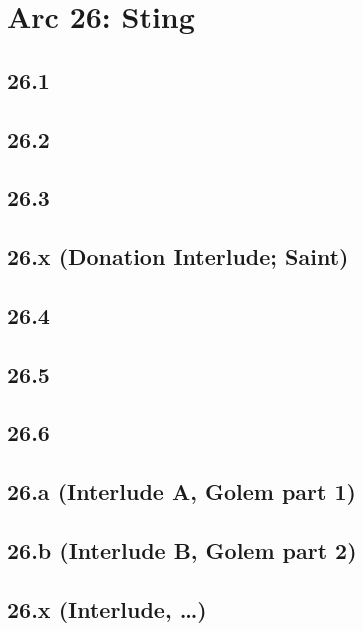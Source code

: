 \part*{Arc 26: Sting}
 \chapter*{26.1}
 \chapter*{26.2}
 \chapter*{26.3}
 \chapter*{26.x (Donation Interlude; Saint)}
 \chapter*{26.4}
 \chapter*{26.5}
 \chapter*{26.6}
 \chapter*{26.a (Interlude A, Golem part 1)}
 \chapter*{26.b (Interlude B, Golem part 2)}
 \chapter*{26.x (Interlude, …)}











